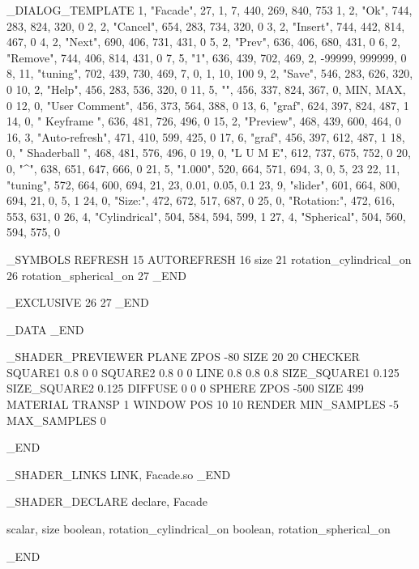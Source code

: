_DIALOG_TEMPLATE
1,	"Facade", 27,	1,	7,	440, 269, 840, 753
   1,	2,	"Ok",		744, 283, 824, 320, 0
   2,	2,	"Cancel",	654, 283, 734, 320, 0
   3,	2,	"Insert",	744, 442, 814, 467, 0
   4,	2,	"Next",		690, 406, 731, 431, 0
   5,	2,	"Prev",		636, 406, 680, 431, 0
   6,	2,	"Remove",	744, 406, 814, 431, 0
   7,	5,	"1",		636, 439, 702, 469, 2, -99999, 999999, 0
   8,	11,	"tuning",	702, 439, 730, 469, 7, 0, 1, 10, 100
   9,	2,	"Save",		546, 283, 626, 320, 0
   10,	2,	"Help",		456, 283, 536, 320, 0
   11,	5,	"",		456, 337, 824, 367, 0, MIN, MAX, 0
   12,	0,	"User Comment",	456, 373, 564, 388, 0
   13,	6,	"graf",		624, 397, 824, 487, 1
   14,	0,	" Keyframe ",	636, 481, 726, 496, 0
   15,	2,	"Preview",	468, 439, 600, 464, 0
   16,	3,	"Auto-refresh",	471, 410, 599, 425, 0
   17,	6,	"graf",		456, 397, 612, 487, 1
   18,	0,	" Shaderball ",	468, 481, 576, 496, 0
   19,	0,	"L U M E",	612, 737, 675, 752, 0
   20,	0,	"^",		638, 651, 647, 666, 0
   21,	5,	"1.000",	520, 664, 571, 694, 3, 0, 5, 23
   22,	11,	"tuning",	572, 664, 600, 694, 21, 23, 0.01, 0.05, 0.1
   23,	9,	"slider",	601, 664, 800, 694, 21, 0, 5, 1
   24,	0,	"Size:",	472, 672, 517, 687, 0
   25,	0,	"Rotation:",	472, 616, 553, 631, 0
   26,	4,	"Cylindrical",	504, 584, 594, 599, 1
   27,	4,	"Spherical",	504, 560, 594, 575, 0

_SYMBOLS
  REFRESH    15
  AUTOREFRESH    16
  size    21
  rotation_cylindrical_on    26
  rotation_spherical_on    27
_END

_EXCLUSIVE
26 27
_END



_DATA
_END


_SHADER_PREVIEWER
PLANE
  ZPOS -80
  SIZE 20 20
  CHECKER
    SQUARE1 0.8 0 0
    SQUARE2 0.8 0 0
    LINE 0.8 0.8 0.8
    SIZE_SQUARE1 0.125
    SIZE_SQUARE2 0.125
    DIFFUSE 0 0 0
SPHERE
  ZPOS -500
  SIZE 499
    MATERIAL
      TRANSP 1
WINDOW
  POS 10 10
RENDER
  MIN_SAMPLES -5
  MAX_SAMPLES 0

_END


_SHADER_LINKS
LINK, Facade.so
_END

_SHADER_DECLARE
declare,	Facade

scalar,  	size
boolean, 	rotation_cylindrical_on
boolean, 	rotation_spherical_on

_END
